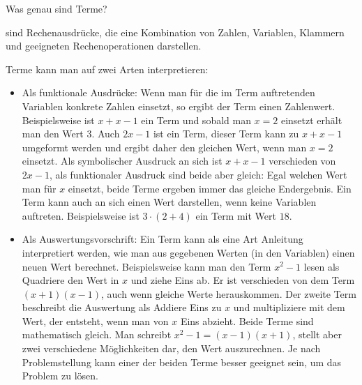 \begin{MIntro}
Was genau sind Terme? 
\begin{MInfo}
 sind Rechenausdrücke, die eine Kombination von Zahlen, Variablen, Klammern und geeigneten Rechenoperationen darstellen.
\end{MInfo}

Terme kann man auf zwei Arten interpretieren:
\begin{itemize}
\item{Als funktionale Ausdrücke: Wenn man für die im Term auftretenden Variablen konkrete Zahlen einsetzt, so ergibt der Term einen Zahlenwert.
Beispielsweise ist $x+x-1$ ein Term und sobald man $x=2$ einsetzt erhält man den Wert $3$. Auch $2x-1$ ist ein Term, dieser Term
kann zu $x+x-1$ umgeformt werden und ergibt daher den gleichen Wert, wenn man $x=2$ einsetzt. Als symbolischer Ausdruck an sich ist $x+x-1$ verschieden von
$2x-1$, als funktionaler Ausdruck sind beide aber gleich: Egal welchen Wert man für $x$ einsetzt, beide Terme ergeben immer das gleiche Endergebnis.
Ein Term kann auch an sich einen Wert darstellen, wenn keine Variablen auftreten. Beispielsweise ist $3\cdot (2+4)$ ein Term mit Wert
$18$.}
\item{Als Auswertungsvorschrift: Ein Term kann als eine Art Anleitung interpretiert werden, wie man aus gegebenen Werten (in den Variablen)
einen neuen Wert berechnet. Beispielsweise kann man den Term $x^2-1$ lesen als \glqq Quadriere den Wert in $x$ und ziehe Eins ab\grqq.
Er ist verschieden von dem Term $(x+1)(x-1)$, auch wenn gleiche Werte herauskommen. Der zweite Term beschreibt die Auswertung als
\glqq Addiere Eins zu $x$ und multipliziere mit dem Wert, der entsteht, wenn man von $x$ Eins abzieht\grqq.
Beide Terme sind mathematisch gleich. Man schreibt $x^2-1=(x-1)(x+1)$, stellt aber zwei verschiedene Möglichkeiten dar,
den Wert auszurechnen. Je nach Problemstellung kann einer der beiden Terme besser geeignet sein, um das Problem zu lösen.}
\end{itemize}

\end{MIntro}


